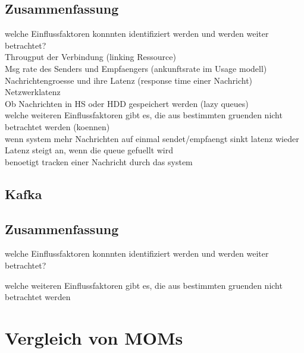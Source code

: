 \subsection{Zusammenfassung}
welche Einflussfaktoren konnnten identifiziert werden und werden weiter betrachtet? \\
Througput der Verbindung (linking Ressource)\\
Msg rate des Senders und Empfaengers (ankunftsrate im Usage modell) \\
Nachrichtengroesse und ihre Latenz (response time einer Nachricht) \\
Netzwerklatenz \\
Ob Nachrichten in HS oder HDD gespeichert werden (lazy queues) \\

welche weiteren Einflussfaktoren gibt es, die aus bestimmten gruenden nicht betrachtet werden (koennen)\\
wenn system mehr Nachrichten auf einmal sendet/empfaengt sinkt latenz wieder \\
Latenz steigt an, wenn die queue gefuellt wird \\
benoetigt tracken einer Nachricht durch das system \\

\subsection{Kafka}

\subsection{Zusammenfassung}
welche Einflussfaktoren konnnten identifiziert werden und werden weiter betrachtet? 

welche weiteren Einflussfaktoren gibt es, die aus bestimmten gruenden nicht betrachtet werden \\
\section{Vergleich von MOMs}


